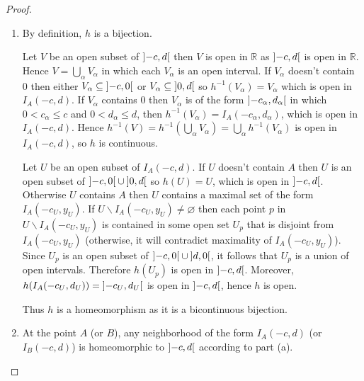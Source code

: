 \begin{proof}
	\begin{enumerate}[label={(\alph*)}]
		\item By definition, \( h \) is a bijection.

		      Let \( V \) be an open subset of \( \left]{-c, d}\right[ \) then \( V \) is open in \( \mathbb{R} \) as \( \left]{-c, d}\right[ \) is open in \( \mathbb{R} \). Hence \( V = \bigcup_{\alpha} V_{\alpha} \) in which each \( V_{\alpha} \) is an open interval. If \( V_{\alpha} \) doesn't contain \( 0 \) then either \( V_{\alpha} \subseteq \left]{-c, 0}\right[ \) or \( V_{\alpha} \subseteq \left]{0, d}\right[ \) so \( h^{-1}(V_{\alpha}) = V_{\alpha} \) which is open in \( I_{A}(-c, d) \). If \( V_{\alpha} \) contains \( 0 \) then \( V_{\alpha} \) is of the form \( \left]{-c_{\alpha}, d_{\alpha}}\right[ \) in which \( 0 < c_{\alpha} \leq c \) and \( 0 < d_{\alpha} \leq d \), then \( h^{-1}(V_{\alpha}) = I_{A}(-c_{\alpha}, d_{\alpha}) \), which is open in \( I_{A}(-c, d) \). Hence \( h^{-1}(V) = h^{-1}\left(\bigcup_{\alpha} V_{\alpha}\right) = \bigcup_{\alpha} h^{-1}(V_{\alpha}) \) is open in \( I_{A}(-c, d) \), so \( h \) is continuous.

		      Let \( U \) be an open subset of \( I_{A}(-c, d) \). If \( U \) doesn't contain \( A \) then \( U \) is an open subset of \( \left]{-c, 0}\right[ \cup \left]{0, d}\right[ \) so \( h(U) = U \), which is open in \( \left]{-c, d}\right[ \). Otherwise \( U \) contains \( A \) then \( U \) contains a maximal set of the form \( I_{A}(-c_{U}, y_{U}) \). If \( U \smallsetminus I_{A}(-c_{U}, y_{U}) \ne \varnothing \) then each point \( p \) in \( U \smallsetminus I_{A}(-c_{U}, y_{U}) \) is contained in some open set \( U_{p} \) that is disjoint from \( I_{A}(-c_{U}, y_{U}) \) (otherwise, it will contradict maximality of \( I_{A}(-c_{U}, y_{U}) \)). Since \( U_{p} \) is an open subset of \( \left]{-c, 0}\right[ \cup \left]{d, 0}\right[ \), it follows that \( U_{p} \) is a union of open intervals. Therefore \( h(U_{p}) \) is open in \( \left]{-c, d}\right[ \). Moreover, \( h(I_{A}(-c_{U}, d_{U})) = \left]{-c_{U}, d_{U}}\right[ \) is open in \( \left]{-c, d}\right[ \), hence \( h \) is open.

		      Thus \( h \) is a homeomorphism as it is a bicontinuous bijection.
		\item At the point \( A \) (or \(B\)), any neighborhood of the form \( I_{A}(-c, d) \) (or \( I_{B}(-c, d) \)) is homeomorphic to \( \left]{-c, d}\right[ \) according to part (a).


\end{enumerate}
\end{proof}
